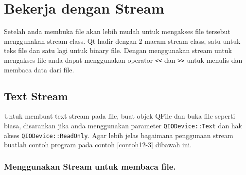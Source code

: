 \section{Bekerja dengan Stream}\label{bekerja-dengan-stream}

Setelah anda membuka file akan lebih mudah untuk mengakses file tersebut
menggunakan stream class. Qt hadir dengan 2 macam stream class, satu
untuk teks file dan satu lagi untuk binary file. Dengan menggunakan
stream untuk mengakses file anda dapat menggunakan operator
\texttt{\textless{}\textless{}} dan
\texttt{\textgreater{}\textgreater{}} untuk menulis dan membaca data
dari file.

\subsection{Text Stream}\label{text-stream}

Untuk membuat text stream pada file, buat objek QFile dan buka file
seperti biasa, disarankan jika anda menggunakan parameter
\texttt{QIODevice::Text} dan hak akses \texttt{QIODevice::ReadOnly}.
Agar lebih jelas bagaimana penggunaan stream buatlah contoh program pada
contoh \ref{contoh12-3} dibawah ini.

\subsubsection*{Menggunakan Stream untuk membaca file.}

